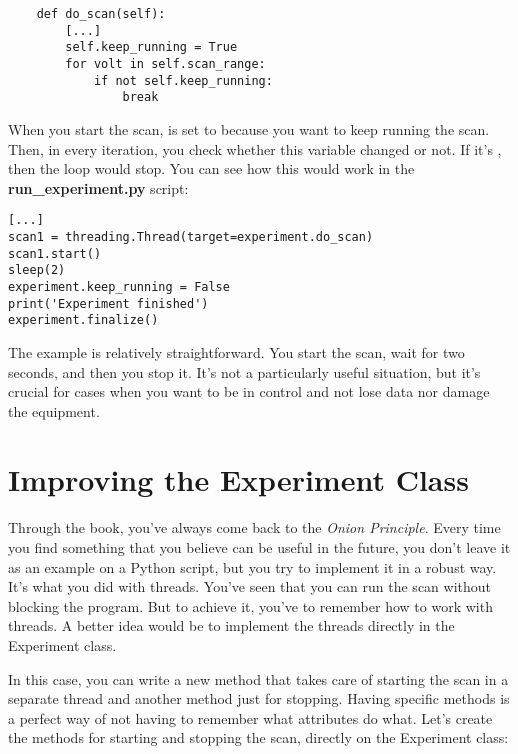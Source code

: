 \begin{verbatim}
    def do_scan(self):
        [...]
        self.keep_running = True
        for volt in self.scan_range:
            if not self.keep_running:
                break
\end{verbatim}
When you start the scan,  is set to  because you want to keep running the scan. Then, in every iteration, you check whether this variable changed or not. If it's , then the loop would stop. You can see how this would work in the \textbf{run\_experiment.py} script:

\begin{verbatim}
[...]
scan1 = threading.Thread(target=experiment.do_scan)
scan1.start()
sleep(2)
experiment.keep_running = False
print('Experiment finished')
experiment.finalize()
\end{verbatim}

The example is relatively straightforward. You start the scan, wait for two seconds, and then you stop it. It's not a particularly useful situation, but it's crucial for cases when you want to be in control and not lose data nor damage the equipment.


\section{Improving the Experiment Class}\label{sec:improving-experiment}
Through the book, you've always come back to the \emph{Onion Principle}. Every time you find something that you believe can be useful in the future, you don't leave it as an example on a Python script, but you try to implement it in a robust way. It's what you did with threads. You've seen that you can run the scan without blocking the program. But to achieve it, you've to remember how to work with threads. A better idea would be to implement the threads directly in the Experiment class.

In this case, you can write a new method that takes care of starting the scan in a separate thread and another method just for stopping. Having specific methods is a perfect way of not having to remember what attributes do what. Let's create the methods for starting and stopping the scan, directly on the Experiment class:

